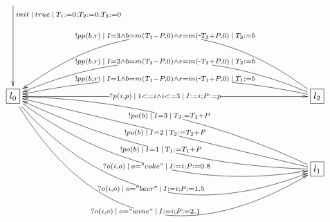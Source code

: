 $\xymatrix{
   \ar[ddd]^<<<<{init\:|\:true\:|\:T_1:=0;T_2:=0;T_3:=0} \\ \\ \\
   \fbox{$l_0$} \ar[rrrrrrrrrr]|{?p(i, p)\:|\:1<=i\land i<=3\:|\:I:=i; P:=p} \ar@/_3pc/[ddrrrrrrrrrr]|{?o(i,o)\:|\:o="coke"\:|\:I:=i; P:=0.8} \ar@/_5pc/[ddrrrrrrrrrr]|{?o(i,o)\:|\:o="beer"\:|\:I:=i; P:=1.5} \ar@/_7pc/[ddrrrrrrrrrr]|{?o(i,o)\:|\:o="wine"\:|\:I:=i; P:=2.1} &&&&&&&&&& \fbox{$l_2$} \ar@/_1.5pc/[llllllllll]|{!pp(b, r)\:|\:I=1\land b=m(T_1-P,0)\land r=m(\scalebox{0.75}[1.0]{-}T_1+P,0)\:|\:T_1:=b} \ar@/_3pc/[llllllllll]|{!pp(b, r)\:|\:I=2\land b=m(T_2-P,0)\land r=m(\scalebox{0.75}[1.0]{-}T_2+P,0)\:|\:T_2:=b} \ar@/_5.2pc/[llllllllll]|{!pp(b, r)\:|\:I=3\land b=m(T_1-P,0)\land r=m(\scalebox{0.75}[1.0]{-}T_3+P,0)\:|\:T_3:=b} \\ \\
   &&&&&&&&&& \fbox{$l_1$} \ar@/^1.5pc/[uullllllllll]|{!po(b)\:|\:I=1\:|\:T_1:=T_1+P} \ar[uullllllllll]|{!po(b)\:|\:I=2\:|\:T_2:=T_2+P} \ar@/_1.5pc/[uullllllllll]|{!po(b)\:|\:I=3\:|\:T_3:=T_3+P} 
}$
